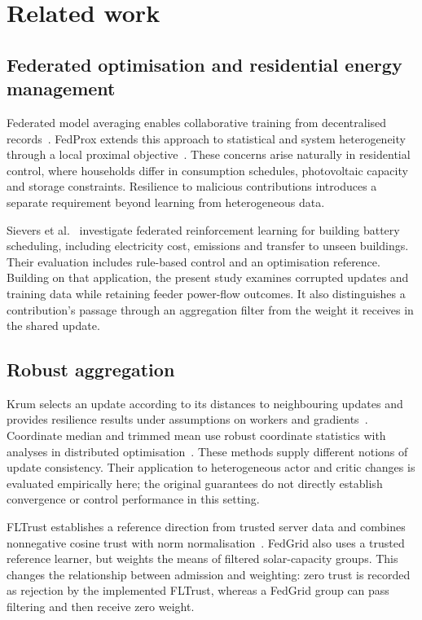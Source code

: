 \section{Related work}
\label{sec:related}
\subsection{Federated optimisation and residential energy management}
Federated model averaging enables collaborative training from decentralised records~\cite{fedavg}. FedProx extends this approach to statistical and system heterogeneity through a local proximal objective~\cite{fedprox}. These concerns arise naturally in residential control, where households differ in consumption schedules, photovoltaic capacity and storage constraints. Resilience to malicious contributions introduces a separate requirement beyond learning from heterogeneous data.

Sievers et al.~\cite{sievers} investigate federated reinforcement learning for building battery scheduling, including electricity cost, emissions and transfer to unseen buildings. Their evaluation includes rule-based control and an optimisation reference. Building on that application, the present study examines corrupted updates and training data while retaining feeder power-flow outcomes. It also distinguishes a contribution's passage through an aggregation filter from the weight it receives in the shared update.

\subsection{Robust aggregation}
Krum selects an update according to its distances to neighbouring updates and provides resilience results under assumptions on workers and gradients~\cite{krum}. Coordinate median and trimmed mean use robust coordinate statistics with analyses in distributed optimisation~\cite{yin}. These methods supply different notions of update consistency. Their application to heterogeneous actor and critic changes is evaluated empirically here; the original guarantees do not directly establish convergence or control performance in this setting.

FLTrust establishes a reference direction from trusted server data and combines nonnegative cosine trust with norm normalisation~\cite{fltrust}. FedGrid also uses a trusted reference learner, but weights the means of filtered solar-capacity groups. This changes the relationship between admission and weighting: zero trust is recorded as rejection by the implemented FLTrust, whereas a FedGrid group can pass filtering and then receive zero weight.

